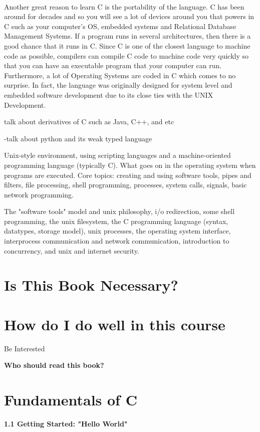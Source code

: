 \documentclass{article}
\begin{document}
\\
Another great reason to learn C is the portability of the language. C has been around for decades and so you will see a lot of devices around you that powers in C such as your computer's OS, embedded systems and Relational Database Management Systems. If a program runs in several architectures, then there is a good chance that it runs in C. Since C is one of the closest language to machine code as possible, compilers can compile C code to machine code very quickly so that you can have an executable program that your computer can run. Furthermore, a lot of Operating Systems are coded in C which comes to no surprise. In fact, the language was originally designed for system level and embedded software development due to its close ties with the UNIX Development. 

{talk about derivatives of C such as Java, C++, and etc}


-talk about python and its weak typed language

 Unix-style environment, using scripting languages and a machine-oriented programming language (typically C). What goes on in the operating system when programs are executed. Core topics: creating and using software tools, pipes and filters, file processing, shell programming, processes, system calls, signals, basic network programming.

The "software tools" model and unix philosophy, i/o redirection, some shell programming, the unix filesystem, the C programming language (syntax, datatypes, storage model), unix processes, the operating system interface, interprocess communication and network communication, introduction to concurrency, and unix and internet security. 

\section{Is This Book Necessary?}

\section{How do I do well in this course}
Be Interested

\textbf{Who should read this book?}

\section{Fundamentals of C}

\textbf{1.1 Getting Started: "Hello World"}
\end{document}
